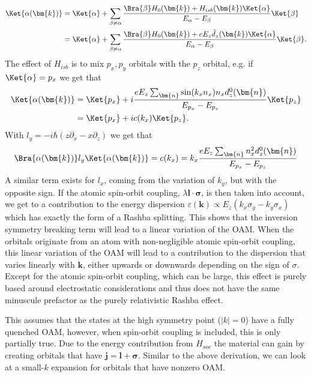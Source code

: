 \begin{align}
	\Ket{\alpha(\bm{k})}&=\Ket{\alpha} + \sum_{\beta \neq \alpha} \frac{\Bra{\beta} H_0(\bm{k}) + H_{isb}(\bm{k}) \Ket{\alpha}}{E_{\alpha} - E_{\beta}} \Ket{\beta}\\
	&=\Ket{\alpha} + \sum_{\beta \neq \alpha} \frac{\Bra{\beta} H_0(\bm{k}) + e E_z \hat{d}_z(\bm{k}) \Ket{\alpha}}{E_{\alpha} - E_{\beta}} \Ket{\beta}.
\end{align}
The effect of $H_{isb}$ is to mix $p_x, p_y$ orbitals with the $p_z$ orbital, e.g. if $\Ket{\alpha} = p_x$ we get that
\begin{align}
	\Ket{\alpha(\bm{k})} &= \Ket{p_x} + i \frac{e E_z \sum_{\bm{n}} \sin(k_x n_x)n_x d_z^0(\bm{n})}{E_{p_x} - E_{p_z}} \Ket{p_z}\\
	&=\Ket{p_x} + i c(k_x) \Ket{p_z}.
\end{align}
With $l_y = -i\hbar(z \partial_x - x \partial_z )$ we get that
\begin{equation}
	\label{eq:oam_from_k}
	\Bra{\alpha(\bm{k})} l_y \Ket{\alpha(\bm{k})} = c(k_x) = k_x \frac{e E_z \sum_{\bm{n}} n_x^2d_z^0(\bm{n})}{E_{p_x} - E_{p_z}}
\end{equation}
A similar term exists for $l_x$, coming from the variation of $k_y$, but with the opposite sign. If the atomic spin-orbit coupling, $\lambda \bm{l}\cdot\bm{\sigma}$, is then taken into account, we get to a contribution to the energy dispersion $\varepsilon(\bm{k}) \propto E_z (k_x \sigma_y - k_y \sigma_x)$ which has exactly the form of a Rashba splitting. 
This shows that the inversion symmetry breaking term will lead to a linear variation of the OAM. When the orbitals originate from an atom with non-negligible atomic spin-orbit coupling, this linear variation of the OAM will lead to a contribution to the dispersion that varies linearly with $\bm{k}$, either upwards or downwards depending on the sign of $\sigma$. Except for the atomic spin-orbit coupling, which can be large, this effect is purely based around electrostatic considerations and thus does not have the same minuscule prefactor as the purely relativistic Rashba effect.

This assumes that the states at the high symmetry point ($|k|=0$) have a fully quenched OAM, however, when spin-orbit coupling is included, this is only partially true. Due to the energy contribution from $H_{soc}$ the material can gain by creating orbitals that have $\bm{j} = \bm{l} + \bm{\sigma}$. Similar to the above derivation, we can look at a small-$k$ expansion for orbitals that have nonzero OAM.

